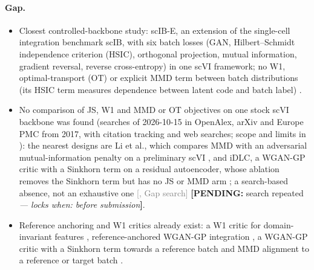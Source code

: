 \documentclass[11pt]{article}
\newcommand{\src}[1]{{\scriptsize\textcolor{gray}{[#1]}}}
\newcommand{\pending}[2]{{\color{BurntOrange}\textbf{[PENDING:} #1 \textit{--- locks when: #2}\textbf{]}}}
\begin{document}
\paragraph{Gap.}
\begin{itemize}
\item Closest controlled-backbone study: scIB-E, an extension of the single-cell integration benchmark scIB, with six batch losses (GAN, Hilbert--Schmidt independence criterion (HSIC), orthogonal projection, mutual information, gradient reversal, reverse cross-entropy) in one scVI framework; no W1, optimal-transport (OT) or explicit MMD term between batch distributions (its HSIC term measures dependence between latent code and batch label) \citep{yi2025benchmarking}.
\item No comparison of JS, W1 and MMD or OT objectives on one stock scVI backbone was found (searches of 2026-10-15 in OpenAlex, arXiv and Europe PMC from 2017, with citation tracking and web searches; scope and limits in ): the nearest designs are Li et al., which compares MMD with an adversarial mutual-information penalty on a preliminary scVI \citep{li2022trade}, and iDLC, a WGAN-GP critic with a Sinkhorn term on a residual autoencoder, whose ablation removes the Sinkhorn term but has no JS or MMD arm \citep{jiang2026geometric}; a search-based absence, not an exhaustive one \src{, Gap search} \pending{search repeated}{before submission}.
\item Reference anchoring and W1 critics already exist: a W1 critic for domain-invariant features \citep{shen2018wasserstein}, reference-anchored WGAN-GP integration \citep{wang2021imap}, a WGAN-GP critic with a Sinkhorn term towards a reference batch \citep{jiang2026geometric} and MMD alignment to a reference or target batch \citep{amodio2019exploring,shaham2017removal}.
\end{itemize}
\end{document}
